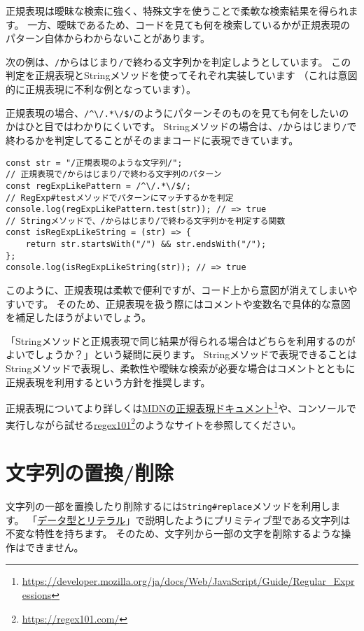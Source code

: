 正規表現は曖昧な検索に強く、特殊文字を使うことで柔軟な検索結果を得られます。
一方、曖昧であるため、コードを見ても何を検索しているかが正規表現のパターン自体からわからないことがあります。

次の例は、\texttt{/}からはじまり\texttt{/}で終わる文字列かを判定しようとしています。
この判定を正規表現とStringメソッドを使ってそれぞれ実装しています
（これは意図的に正規表現に不利な例となっています）。

正規表現の場合、\texttt{/\^{}\textbackslash/.*\textbackslash/\$/}のようにパターンそのものを見ても何をしたいのかはひと目ではわかりにくいです。
Stringメソッドの場合は、\texttt{/}からはじまり\texttt{/}で終わるかを判定してることがそのままコードに表現できています。

\begin{lstlisting}
const str = "/正規表現のような文字列/";
// 正規表現で/からはじまり/で終わる文字列のパターン
const regExpLikePattern = /^\/.*\/$/;
// RegExp#testメソッドでパターンにマッチするかを判定
console.log(regExpLikePattern.test(str)); // => true
// Stringメソッドで、/からはじまり/で終わる文字列かを判定する関数
const isRegExpLikeString = (str) => {
    return str.startsWith("/") && str.endsWith("/");
};
console.log(isRegExpLikeString(str)); // => true
\end{lstlisting}

このように、正規表現は柔軟で便利ですが、コード上から意図が消えてしまいやすいです。
そのため、正規表現を扱う際にはコメントや変数名で具体的な意図を補足したほうがよいでしょう。

「Stringメソッドと正規表現で同じ結果が得られる場合はどちらを利用するのがよいでしょうか？」という疑問に戻ります。
Stringメソッドで表現できることはStringメソッドで表現し、柔軟性や曖昧な検索が必要な場合はコメントとともに正規表現を利用するという方針を推奨します。

正規表現についてより詳しくは\href{https://developer.mozilla.org/ja/docs/Web/JavaScript/Guide/Regular_Expressions}{MDNの正規表現ドキュメント}\footnote{\url{https://developer.mozilla.org/ja/docs/Web/JavaScript/Guide/Regular_Expressions}}や、コンソールで実行しながら試せる\href{https://regex101.com/}{regex101}\footnote{\url{https://regex101.com/}}のようなサイトを参照してください。

\hypertarget{replace-delete}{%
\section{文字列の置換/削除}\label{replace-delete}}

文字列の一部を置換したり削除するには\texttt{String\#replace}メソッドを利用します。
「\hyperlink{data-type-and-literal}{データ型とリテラル}」で説明したようにプリミティブ型である文字列は不変な特性を持ちます。
そのため、文字列から一部の文字を削除するような操作はできません。

